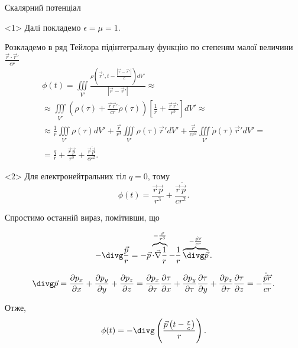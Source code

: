 \documentclass[onlytextwidth]{beamer}
\let\vect\vec
\begin{document}
\begin{frame}{Скалярний потенціал}{}
	\begin{onlyenv}
		Далі покладемо $ \epsilon = \mu = 1 $.

		Розкладемо  в ряд Тейлора підінтегральну функцію  по степеням малої величини $  \frac{\vect{r} \cdot \vect{r}'}{cr} $
		\begin{multline*}
			\phi(t) = \iiint\limits_{V'}\frac{\rho\left(\vect{r}', t - \frac{|\vect{r} - \vect{r}'|}{c}\right)  dV'}{|\vect{r} - \vect{r}'|} \approx \\ \approx
			\iiint\limits_{V'} \left( \rho(\tau) +  \frac{\vect{r} \vect{r}'}{cr} \dot{\rho}(\tau)\right) \left[ \frac1{r} + \frac{\vect{r}  \vect{r}'}{r^3} \right]dV' \approx \\
			\approx \frac1r\iiint\limits_{V'} {\rho(\tau)} dV' + \frac{\vect{r}  }{r^3}\iiint\limits_{V'}\rho(\tau)\vect{r}' dV' + \frac{\vect{r} }{cr^2}\iiint\limits_{V'} \dot{\rho}(\tau) \vect{r}'dV' = \\
			= \frac{q}{r} + \frac{\vect{r}\vect{p}}{r^3} + \frac{\vect{r}\dot{\vect{p}}}{cr^2}.
		\end{multline*}
	\end{onlyenv}
	\begin{onlyenv}
		Для електронейтральних тіл $ q = 0 $, тому
		\begin{equation*}
			\phi(t)  = \frac{\vect{r}\vect{p}}{r^3} + \frac{\vect{r}\dot{\vect{p}}}{cr^2}.
		\end{equation*}

		Спростимо останній вираз, помітивши, що

		\begin{equation*}
			-\divg\frac{\vect{p}}{r} = -\vect{p}\overbrace{\cdot\vect{\nabla}\frac1r}^{-\frac{\vect{r}}{r^3}} - \frac1r\overbrace{\divg\vect{p}}^{-\frac{\dot{\vect{p}}\vect{r}}{cr}}.
		\end{equation*}

		\begin{equation*}
			\divg\vect{p} = \frac{\partial p_x}{\partial x} + \frac{\partial p_y}{\partial y} + \frac{\partial p_z}{\partial z} = \frac{\partial p_x}{\partial \tau}\frac{\partial\tau}{\partial x} + \frac{\partial p_y}{\partial \tau}\frac{\partial\tau}{\partial y} +\frac{\partial p_z}{\partial \tau}\frac{\partial\tau}{\partial z} = -\frac{\dot{\vect{p}}\vect{r}}{cr}.
		\end{equation*}

		Отже,
		\begin{equation*}
			\phi(t) = -\divg\left( \frac{\vect{p}\left(t - \frac{r}{c}\right)}{r} \right).
		\end{equation*}
	\end{onlyenv}
\end{frame}
\end{document}
